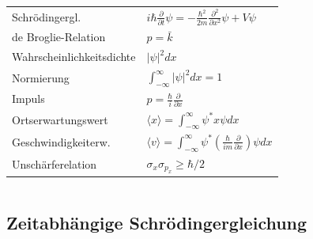 \documentclass[12pt,a4paper]{article}
\newcommand{\abs}[1]{\left| #1 \right|}
\newcommand{\pd}[2]{\frac{\partial #1}{\partial #2}}
\newcommand{\pdd}[2]{\frac{\partial^2 #1}{\partial #2^2}}
\renewcommand{\=}[1]{\stackrel{#1}{=}}
\newcommand{\erw}[1]{\langle #1 \rangle}
\theoremstyle{definition}
\theoremstyle{remark}
\begin{document}
\begin{minipage}[t]{.45\linewidth}
\vspace{0pt}
\noindent\begin{tabular}{ll}

Schrödingergl. & $i \hbar \pd{}{t} \psi = - \frac{\hbar^2}{2m}\pdd{}{x} \psi + V \psi$\\
de Broglie-Relation & $p = \bar k$\\
Wahrscheinlichkeitsdichte & $\abs{\psi}^2 dx$\\
Normierung & $\int_{-\infty}^{\infty} \abs{\psi}^2 dx = 1$\\
Impuls & $p = \frac{\hbar}{i}\pd{}{x}$\\
Ortserwartungswert & $\erw x = \int_{-\infty}^{\infty} \psi^* x \psi dx$\\
Geschwindigkeiterw. & $\erw v = \int_{-\infty}^{\infty} \psi^* (\frac{\hbar}{i m}\pd{}{x}) \psi dx$\\
Unschärferelation & $\sigma_x \sigma_{p_x} \geq \hbar/2$\\

\end{tabular}
\end{minipage}%
\hspace{0.02\linewidth}
\begin{minipage}[t]{.45\linewidth}
\vspace{0pt}
\begin{tabular}{ll}
\toprule


\end{tabular}
\end{minipage}


\subsection{Zeitabhängige Schrödingergleichung}
\end{document}
